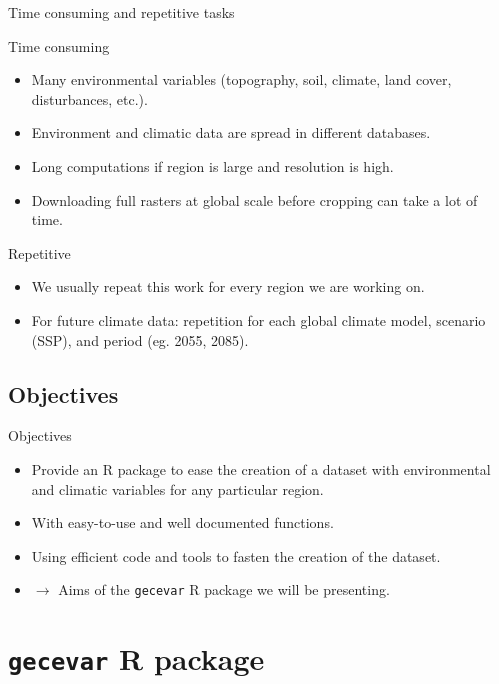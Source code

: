 \documentclass[10pt,table,dvipsnames,compress]{beamer}
\begin{document}
\begin{frame}[label={sec:org391470f}]{Time consuming and repetitive tasks}
\begin{block}{Time consuming}
\begin{itemize}
\item Many environmental variables (topography, soil, climate, land cover, disturbances, etc.).
\item Environment and climatic data are spread in different databases.
\item Long computations if region is large and resolution is high.
\item Downloading full rasters at global scale before cropping can take a lot of time.
\end{itemize}
\end{block}

\begin{block}{Repetitive}
\begin{itemize}
\item We usually repeat this work for every region we are working on.
\item For future climate data: repetition for each global climate model, scenario (SSP), and period (eg. 2055, 2085).
\end{itemize}
\end{block}
\end{frame}

\subsection{Objectives}
\label{sec:orgf4c877d}

\begin{frame}[label={sec:org278d8c0},fragile]{Objectives}
 \begin{itemize}
\item Provide an R package to ease the creation of a dataset with environmental and climatic variables for any particular region.
\item With easy-to-use and well documented functions.
\item Using efficient code and tools to fasten the creation of the dataset.
\item \(\rightarrow\) Aims of the \texttt{gecevar} R package we will be presenting.
\end{itemize}
\end{frame}

\section{\texttt{gecevar} R package}
\label{sec:orga88ec49}
\end{document}
